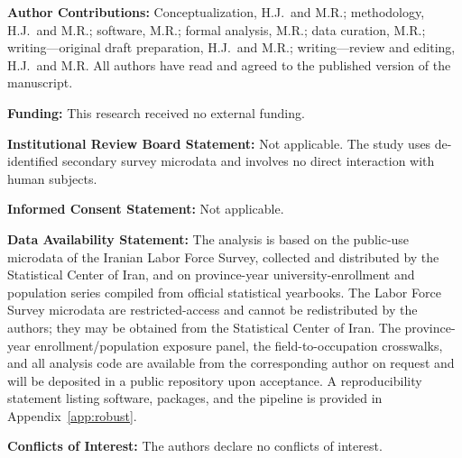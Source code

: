 \documentclass[11pt]{article}
\begin{document}
\begin{abstract}
\end{abstract}

\newpage


\bigskip
\noindent\textbf{Author Contributions:} Conceptualization, H.J.\ and M.R.; methodology, H.J.\ and M.R.; software, M.R.; formal analysis, M.R.; data curation, M.R.; writing---original draft preparation, H.J.\ and M.R.; writing---review and editing, H.J.\ and M.R. All authors have read and agreed to the published version of the manuscript.

\smallskip
\noindent\textbf{Funding:} This research received no external funding.

\smallskip
\noindent\textbf{Institutional Review Board Statement:} Not applicable. The study uses de-identified secondary survey microdata and involves no direct interaction with human subjects.

\smallskip
\noindent\textbf{Informed Consent Statement:} Not applicable.

\smallskip
\noindent\textbf{Data Availability Statement:} The analysis is based on the public-use microdata of the Iranian Labor Force Survey, collected and distributed by the Statistical Center of Iran, and on province-year university-enrollment and population series compiled from official statistical yearbooks. The Labor Force Survey microdata are restricted-access and cannot be redistributed by the authors; they may be obtained from the Statistical Center of Iran. The province-year enrollment/population exposure panel, the field-to-occupation crosswalks, and all analysis code are available from the corresponding author on request and will be deposited in a public repository upon acceptance. A reproducibility statement listing software, packages, and the pipeline is provided in Appendix~\ref{app:robust}.

\smallskip
\noindent\textbf{Conflicts of Interest:} The authors declare no conflicts of interest.

\clearpage


\clearpage


\end{document}
